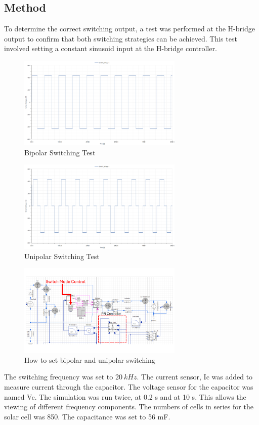 \documentclass[12pt,twoside]{scrartcl}
\begin{document}
\subsection{Method}
To determine the correct switching output, a test was performed at the H-bridge output to confirm that both
switching strategies can be achieved. 
This test involved setting a constant sinusoid input at the H-bridge controller.
\begin{figure}[htp]
    \centering
    \includegraphics[width=0.7\textwidth]{Bipolar_sw.png}
    \caption{Bipolar Switching Test}
    \label{fig:Bipolar Switching}
\end{figure}
\begin{figure}[htp]
    \centering
    \includegraphics[width=0.7\textwidth]{Unipolar_sw.png}
    \caption{Unipolar Switching Test}
    \label{fig:Unipolar Switching}
\end{figure}
\newpage
\noindent
\begin{figure}[htp]
    \centering
    \includegraphics[width=0.7\textwidth]{Set-Up.PNG}
    \caption{How to set bipolar and unipolar switching}
    \label{fig:Set Up}
\end{figure}
\newline
\noindent
The switching frequency was set to 20$\: kHz$. The current sensor, Ic was added to measure current 
through the capacitor. The voltage sensor for the capacitor was named Vc. The simulation was run twice, at 0.2 s and at 10 s. This allows the 
viewing of different frequency components. The numbers of cells in series for the solar cell was 850. The capacitance was set to 56 mF.
\newpage
\end{document}
